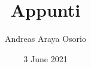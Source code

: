 \documentclass[12pt, a4paper]{article}
\title{Appunti}
\author{Andreas Araya Osorio}
\date{3 June 2021}
\begin{document}
\maketitle

\tableofcontents
\let\tableofcontents\relax






\end{document}
